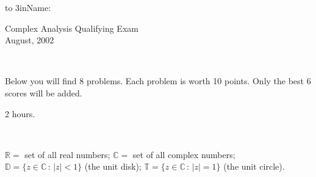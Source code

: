 \documentclass[12pt]{article}
\begin{document}
\vspace*{-1in}
\hfill\hbox to 3in{{Name: }\hrulefill}
\vspace{1in}
\begin{center}{\large Complex Analysis Qualifying Exam}
\\\bigskip
{\large August, 2002}
\end{center}

\

  Below you will find 8 problems.
Each problem is worth 10 points. Only the
best 6 scores will be added.

 2 hours.

\

 $\mathbb{R}=$ set of all real numbers;
$\mathbb{C}=$ set of all complex numbers; $\mathbb{D}=\{z\in\mathbb{C}\,:\,|z|<1\}$ (the unit disk); $\mathbb{T}=\{z\in\mathbb{C}\,:\,|z|=1\}$ (the unit circle).

\
\end{document}
